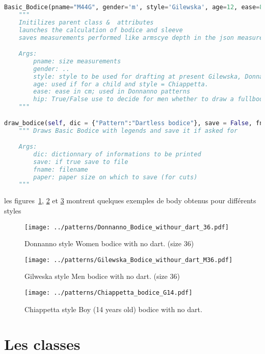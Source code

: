\documentclass[11pt,a4paper]{report}
\begin{document}
\begin{lstlisting}[language=python]
Basic_Bodice(pname="M44G", gender='m', style='Gilewska', age=12, ease=8, hip=True):
	"""
	Initilizes parent class &  attributes
	launches the calculation of bodice and sleeve
	saves measurements performed like armscye depth in the json measurements file for further processing in other classes

	Args:
		pname: size measurements
		gender: ..
		style: style to be used for drafting at present Gilewska, Donnanno and Chiapetta (for kids)
		age: used if for a child and style = Chiappetta.
		ease: ease in cm; used in Donnanno patterns
		hip: True/False use to decide for men whether to draw a fullbodice
	"""

draw_bodice(self, dic = {"Pattern":"Dartless bodice"}, save = False, fname = None, paper='FullSize'):
	""" Draws Basic Bodice with legends and save it if asked for

	Args:
		dic: dictionnary of informations to be printed
		save: if true save to file
		fname: filename
		paper: paper size on which to save (for cuts)
	"""
\end{lstlisting}

les figures~\ref{fig:bodice_DW36}, \ref{fig:bodice_MG36} et \ref{fig:CB14} montrent quelques exemples de body obtenus pour différents styles


\begin{figure}[hbtp]
\centering
\texttt{[image: ../patterns/Donnanno\_Bodice\_withour\_dart\_36.pdf]}
\caption{Donnanno style Women bodice with no dart. (size 36)}
\label{fig:bodice_DW36}
\end{figure}

\begin{figure}[hbtp]
\centering
\texttt{[image: ../patterns/Gilewska\_Bodice\_withour\_dart\_M36.pdf]}
\caption{Gilweska style Men bodice with no dart. (size 36)}
\label{fig:bodice_MG36}
\end{figure}

\begin{figure}[hbtp]
\centering
\texttt{[image: ../patterns/Chiappetta\_bodice\_G14.pdf]}
\caption{Chiappetta style Boy (14 years old) bodice with no dart.}
\label{fig:CB14}
\end{figure}




\chapter{Les classes}
\end{document}
